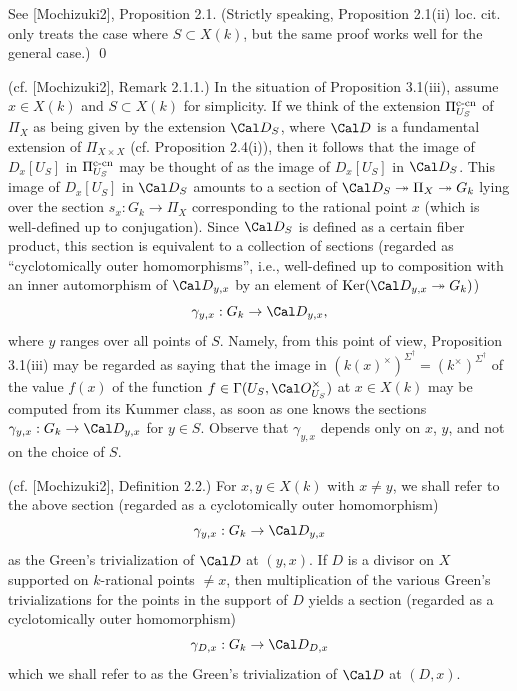  See [Mochizuki2], Proposition 2.1. (Strictly speaking, 
Proposition 2.1(ii) loc. cit. only treats the case where $S\subset X(k)$, 
but the same proof works well for the general case.) 
\qed
\enddemo

 (cf. [Mochizuki2], Remark 2.1.1.) 
In the situation of 
Proposition 3.1(iii), assume $x\in X(k)$ and $S\subset X(k)$ for simplicity.
If we think of the extension $\Pi _{U_S}^{\text{\rm c-cn}}$ 
of $\Pi_X$ as being given by the extension $\Cal D_S$, where $\Cal D$ is a
fundamental extension of $\Pi _{X\times X}$ (cf. Proposition 2.4(i)), 
then it follows that the 
image of $D_x[U_S]$ in $\Pi _{U_S}^{\text{\rm c-cn}}$ may be thought of 
as the image of $D_x[U_S]$ in $\Cal D_S$. 
This image of $D_x[U_S]$ in $\Cal D_S$
amounts to a section of $\Cal D_S\twoheadrightarrow \Pi_X
\twoheadrightarrow G_k$ lying over the section $s_x:G_k\to \Pi_X$ 
corresponding to the rational point $x$ (which is well-defined up to
conjugation). Since $\Cal D_S$ is defined as a 
certain fiber product, this section is equivalent to a collection 
of sections (regarded as ``cyclotomically outer homomorphisms'', i.e., well-defined
up to composition with an inner automorphism of $\Cal D_{y,x}$ by an element
of $\Ker (\Cal D_{y,x}\twoheadrightarrow G_k)$)
$$\gamma _{y,x}:G_k\to \Cal D_{y,x},$$
where $y$ ranges over all points of $S$. Namely, from this point 
of view, Proposition 3.1(iii) may be regarded as saying that the image
in $(k(x)^{\times})^{\Sigma^{\dag}}
=(k^{\times})^{\Sigma^{\dag}}$ of the value $f(x)$ of the function 
$f\in \Gamma (U_S,\Cal O_{U_S}^{\times})$ at $x\in X(k)$ may be 
computed from its Kummer class, as
soon as one knows the sections $\gamma _{y,x}:G_k\to \Cal D_{y,x}$ 
for $y\in S$. Observe that $\gamma _{y,x}$ depends only on $x$, $y$, and 
not on the choice of $S$.
\enddefinition

 (cf. [Mochizuki2], Definition 2.2.)
For $x,y\in X(k)$ with $x\neq y$, we shall 
refer to the above section (regarded as a cyclotomically outer homomorphism)
$$\gamma _{y,x}:G_k\to \Cal D_{y,x}$$
as the Green's trivialization of $\Cal D$ at $(y,x)$. If $D$ is a 
divisor on $X$ supported on $k$-rational points $\neq x$, 
then multiplication of the various  Green's trivializations for 
the points in the support of $D$ yields a section (regarded as a 
cyclotomically outer homomorphism)
$$\gamma _{D,x}:G_k\to \Cal D_{D,x}$$
which we shall refer to as the Green's trivialization of $\Cal D$ at 
$(D,x)$.
\enddefinition

